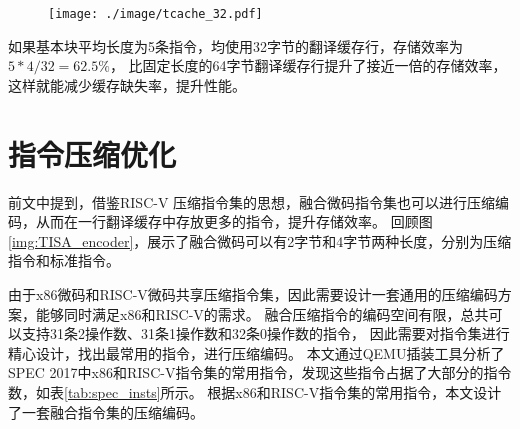 \begin{figure}[!htbp]
    \centering
    \texttt{[image: ./image/tcache\_32.pdf]}
    \label{img:tcache_32}
  \end{figure}

如果基本块平均长度为5条指令，均使用32字节的翻译缓存行，存储效率为$ 5*4 / 32 = 62.5\% $，
比固定长度的64字节翻译缓存行提升了接近一倍的存储效率，这样就能减少缓存缺失率，提升性能。

\section{指令压缩优化}

前文中提到，借鉴RISC-V 压缩指令集的思想，融合微码指令集也可以进行压缩编码，从而在一行翻译缓存中存放更多的指令，提升存储效率。
回顾图\ref{img:TISA_encoder}，展示了融合微码可以有2字节和4字节两种长度，分别为压缩指令和标准指令。

由于x86微码和RISC-V微码共享压缩指令集，因此需要设计一套通用的压缩编码方案，能够同时满足x86和RISC-V的需求。
融合压缩指令的编码空间有限，总共可以支持31条2操作数、31条1操作数和32条0操作数的指令，
因此需要对指令集进行精心设计，找出最常用的指令，进行压缩编码。
本文通过QEMU插装工具分析了SPEC 2017中x86和RISC-V指令集的常用指令，发现这些指令占据了大部分的指令数，如表\ref{tab:spec_insts}所示。
根据x86和RISC-V指令集的常用指令，本文设计了一套融合指令集的压缩编码。



